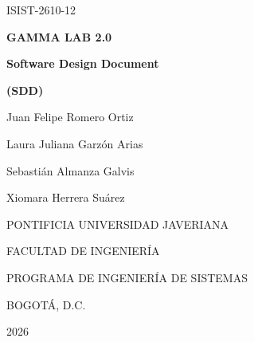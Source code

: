 \documentclass[12pt,letterpaper,oneside]{article}
\DeclareRobustCommand{\_}{\textunderscore\allowbreak}
\newcommand{\tituloProyecto}{GAMMA LAB 2.0}
\newcommand{\grupo}{ISIST-2610-12}
\newcommand{\autorUno}{Juan Felipe Romero Ortiz}
\newcommand{\autorDos}{Laura Juliana Garzón Arias}
\newcommand{\autorTres}{Sebastián Almanza Galvis}
\newcommand{\autorCuatro}{Xiomara Herrera Suárez}
\newcommand{\universidad}{PONTIFICIA UNIVERSIDAD JAVERIANA}
\newcommand{\facultad}{FACULTAD DE INGENIERÍA}
\newcommand{\programa}{PROGRAMA DE INGENIERÍA DE SISTEMAS}
\newcommand{\ciudad}{BOGOTÁ, D.C.}
\newcommand{\anio}{2026}
\newcommand{\fechaLarga}{Noviembre, 2026}
\begin{document}
\providecommand{\tituloProyecto}{GAMMA LAB 2.0}
\providecommand{\grupo}{ISIST-2610-12}
\providecommand{\autorUno}{Juan Felipe Romero Ortiz}
\providecommand{\autorDos}{Laura Juliana Garzón Arias}
\providecommand{\autorTres}{Sebastián Almanza Galvis}
\providecommand{\autorCuatro}{Xiomara Herrera Suárez}
\providecommand{\leyendaGrado}{MEMORIA DE PROYECTO DE GRADO REALIZADO PARA CUMPLIR UNO DE
LOS REQUISITOS PARA EL TÍTULO EN INGENIERÍA DE SISTEMAS}
\providecommand{\director}{Ing. Cécile Gauthier Umaña}
\providecommand{\juradoUno}{Ing. Leonardo Flórez}
\providecommand{\juradoDos}{Ing. Alexander Caicedo}
\providecommand{\universidad}{PONTIFICIA UNIVERSIDAD JAVERIANA}
\providecommand{\universidadNombre}{Pontificia Universidad Javeriana}
\providecommand{\facultad}{FACULTAD DE INGENIERÍA}
\providecommand{\programa}{PROGRAMA DE INGENIERÍA DE SISTEMAS}
\providecommand{\ciudad}{BOGOTÁ, D.C.}
\providecommand{\anio}{2026}
\providecommand{\fechaLarga}{Noviembre, 2026}
\providecommand{\rector}{P. Luis Fernando Múnera Congote, S.J.}
\providecommand{\decano}{Ing. Diego Alejandro Patiño Guevara, Ph.D.}
\providecommand{\directorDepto}{Ing. César Julio Bustacara Medina, Ph.D.}
\providecommand{\directorCarrera}{Ing. Andrea del Pilar Rueda Olarte}

\begingroup\setlength{\parskip}{0pt}%

\thispagestyle{empty}
\begin{center}
  \vspace*{1cm}
  {\large \grupo}\par\vspace{1.2cm}
  {\LARGE\bfseries \tituloProyecto}\par\vspace{1cm}
  {\Large\bfseries Software Design Document}\par\vspace{0.3cm}
  {\large\bfseries (SDD)}\par\vspace{2cm}
  \autorUno\par
  \autorDos\par
  \autorTres\par
  \autorCuatro\par
  \vfill
  \universidad\par
  \facultad\par
  \programa\par
  \ciudad\par
  \anio\par
  \vspace{1cm}
\end{center}
\clearpage
\end{document}
